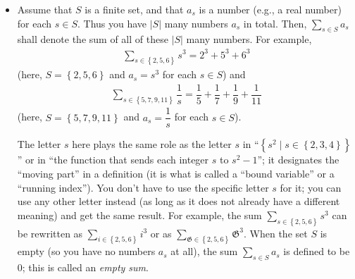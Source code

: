\documentclass[paper=a4, fontsize=12pt]{scrartcl} %
\newcommand{\set}[1]{\left\{ #1 \right\}}
\newcommand{\abs}[1]{\left| #1 \right|}
\let\sumnonlimits\sum
\renewcommand{\sum}{\sumnonlimits\limits}
\theoremstyle{plainsl}
\theoremstyle{definition}
\theoremstyle{remark}
\begin{document}
\begin{itemize}

\item Assume that $S$ is a finite set, and that $a_s$ is a
      number (e.g., a real number) for each $s \in S$.
      Thus you have $\abs{S}$ many numbers $a_s$ in total.
      Then, $\sum_{s \in S} a_s$ shall denote the sum of all
      of these $\abs{S}$ many numbers.
      For example,
      \begin{align*}
      \sum_{s \in \set{2, 5, 6}} s^3 = 2^3 + 5^3 + 6^3
      \end{align*}
      (here, $S = \set{2, 5, 6}$ and $a_s = s^3$ for each
      $s \in S$)
      and
      \begin{align*}
      \sum_{s \in \set{5, 7, 9, 11}} \dfrac{1}{s}
       = \dfrac{1}{5} + \dfrac{1}{7} + \dfrac{1}{9} + \dfrac{1}{11}
      \end{align*}
      (here, $S = \set{5, 7, 9, 11}$ and $a_s = \dfrac{1}{s}$
      for each $s \in S$).
      
      The letter $s$ here plays the same role as the
      letter $s$ in ``$\set{s^2 \mid s \in \set{2, 3, 4}}$''
      or in ``the function that sends each integer $s$ to
      $s^2 - 1$''; it designates the ``moving part'' in a
      definition (it is what is called a ``bound variable''
      or a ``running index'').
      You don't have to use the specific letter $s$ for it;
      you can use any other letter instead (as long as it
      does not already have a different meaning) and get the
      same result.
      For example, the sum $\sum_{s \in \set{2, 5, 6}} s^3$
      can be rewritten as
      $\sum_{i \in \set{2, 5, 6}} i^3$ or as
      $\sum_{\mathfrak{G} \in \set{2, 5, 6}} \mathfrak{G}^3$.
      When the set $S$ is empty (so you have no numbers $a_s$
      at all), the sum $\sum_{s \in S} a_s$ is defined
      to be $0$; this is called an \textit{empty sum}.


\end{itemize}
\end{document}
